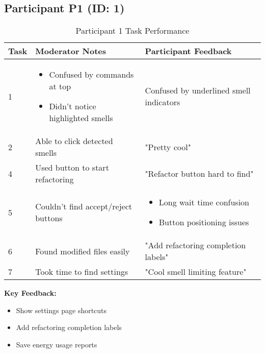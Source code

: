 \documentclass{article}
\begin{document}
\subsection{Participant P1 (ID: 1)}
\begin{table}[H]
\centering
\caption{Participant 1 Task Performance}
\begin{tabular}{|l|p{4cm}|p{4cm}|}
\hline
\textbf{Task} & \textbf{Moderator Notes} & \textbf{Participant Feedback} \\ \hline
1 & \begin{itemize}
\item Confused by commands at top
\item Didn't notice highlighted smells
\end{itemize} & Confused by underlined smell indicators \\ \hline
2 & Able to click detected smells & "Pretty cool" \\ \hline
4 & Used button to start refactoring & "Refactor button hard to find" \\ \hline
5 & Couldn't find accept/reject buttons & \begin{itemize}
\item Long wait time confusion
\item Button positioning issues
\end{itemize} \\ \hline
6 & Found modified files easily & "Add refactoring completion labels" \\ \hline
7 & Took time to find settings & "Cool smell limiting feature" \\ \hline
\end{tabular}
\end{table}

\textbf{Key Feedback:}
\begin{itemize}
\item Show settings page shortcuts
\item Add refactoring completion labels
\item Save energy usage reports
\end{itemize}
\end{document}
